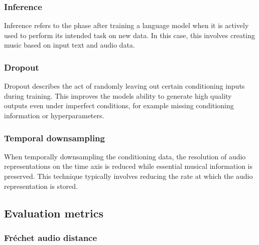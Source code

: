 \documentclass[a4paper,12pt,twoside]{article}
\newenvironment{aigen}{\begin{tcolorbox}[colback=blue!5!white, colframe=blue!75!black, title=AI-Generated Section]}{\end{tcolorbox}}
\begin{document}
\subsubsection*{Inference}\label{sec:inferenceTime}

Inference refers to the phase after training a language model when it is actively used to perform its intended task on new data. In this case, this involves creating music based on input text and audio data.

\subsubsection*{Dropout}\label{sec:dropout}

Dropout describes the act of randomly leaving out certain conditioning inputs during training. This improves the models ability to generate high quality outputs even under imperfect conditions, for example missing conditioning information or hyperparameters.

\subsubsection*{Temporal downsampling}\label{sec:temporalDownsampling}

When temporally downsampling the conditioning data, the resolution of audio representations on the time axis is reduced while essential musical information is preserved. This technique typically involves reducing the rate at which the audio representation is stored.



\subsection{Evaluation metrics}

\subsubsection*{Fréchet audio distance}\label{sec:FAD}
\end{document}
